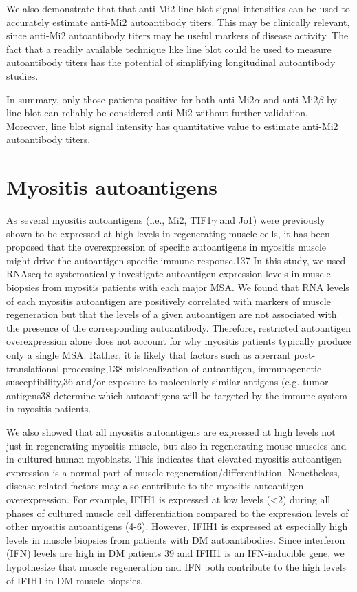 We also demonstrate that that anti-Mi2 line blot signal intensities can be used to accurately estimate anti-Mi2 autoantibody titers. This may be clinically relevant, since anti-Mi2 autoantibody titers may be useful markers of disease activity. The fact that a readily available technique like line blot could be used to measure autoantibody titers has the potential of simplifying longitudinal autoantibody studies.

In summary, only those patients positive for both anti-Mi2$\alpha$ and anti-Mi2$\beta$ by line blot can reliably be considered anti-Mi2 without further validation. Moreover, line blot signal intensity has quantitative value to estimate anti-Mi2 autoantibody titers.

\section{Myositis autoantigens}

As several myositis autoantigens (i.e., Mi2, TIF1$\gamma$ and Jo1) were previously shown to be expressed at high levels in regenerating muscle cells, it has been proposed that the overexpression of specific autoantigens in myositis muscle might drive the autoantigen-specific immune response.137 In this study, we used RNAseq to systematically investigate autoantigen expression levels in muscle biopsies from myositis patients with each major MSA.  We found that RNA levels of each myositis autoantigen are positively correlated with markers of muscle regeneration but that the levels of a given autoantigen are not associated with the presence of the corresponding autoantibody.  Therefore, restricted autoantigen overexpression alone does not account for why myositis patients typically produce only a single MSA. Rather, it is likely that factors such as aberrant post-translational processing,138 mislocalization of autoantigen, immunogenetic susceptibility,36 and/or exposure to molecularly similar antigens (e.g. tumor antigens38 determine which autoantigens will be targeted by the immune system in myositis patients. 

We also showed that all myositis autoantigens are expressed at high levels not just in regenerating myositis muscle, but also in regenerating mouse muscles and in cultured human myoblasts.  This indicates that elevated myositis autoantigen expression is a normal part of muscle regeneration/differentiation.  Nonetheless, disease-related factors may also contribute to the myositis autoantigen overexpression.  For example, IFIH1 is expressed at low levels (<2) during all phases of cultured muscle cell differentiation compared to the expression levels of other myositis autoantigens (4-6).  However, IFIH1 is expressed at especially high levels in muscle biopsies from patients with DM autoantibodies.  Since interferon (IFN) levels are high in DM patients 39 and IFIH1 is an IFN-inducible gene, we hypothesize that muscle regeneration and IFN both contribute to the high levels of IFIH1 in DM muscle biopsies.   

